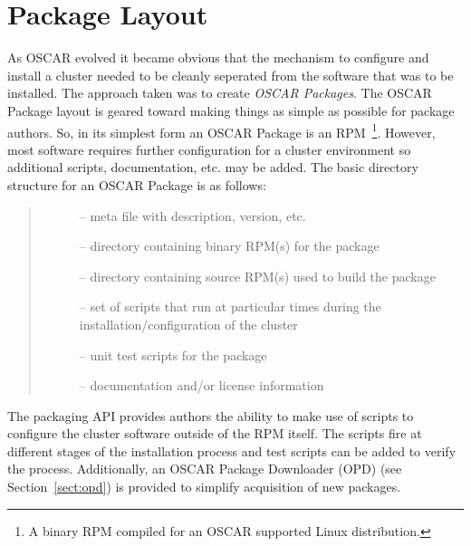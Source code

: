 
\section{Package Layout}
\label{sect:pkg-layout}

As OSCAR evolved it became obvious that the mechanism to configure and
install a cluster needed to be cleanly seperated from the software that was
to be installed.  The approach taken was to create \emph{OSCAR Packages}.
The OSCAR Package layout is geared toward making things as simple as
possible for package authors.  So, in its simplest form an OSCAR Package is
an RPM~\footnote{A binary RPM compiled for an OSCAR supported Linux
distribution.}.  However, most software requires further configuration for
a cluster environment so additional scripts, documentation, etc. may be
added.  The basic directory structure for an OSCAR Package is as follows:

\begin{quote}
\begin{description}
    \item[] -- meta file with description, version, etc.
    \item[] -- directory containing binary RPM(s) for the package
    \item[] -- directory containing source RPM(s) used to build
                            the package
    \item[] --  set of scripts that run at particular times
                     during the installation/configuration of the cluster
    \item[] -- unit test scripts for the package
    \item[] -- documentation and/or license information
\end{description}
\end{quote}


The packaging API provides authors the ability to make use of scripts to
configure the cluster software outside of the RPM itself.  The scripts fire
at different stages of the installation process and test scripts can be
added to verify the process. Additionally, an OSCAR Package Downloader
(OPD) (see Section~\ref{sect:opd}) is provided to simplify acquisition of
new packages.



